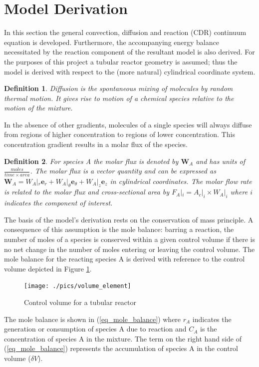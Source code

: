 \documentclass[11pt,fleqn]{article}
\theoremstyle{defstyle}
\newtheorem{defn}{Definition}[section]
\begin{document}
\section{Model Derivation}
In this section the general convection, diffusion and reaction (CDR) continuum equation is developed. Furthermore, the accompanying energy balance necessitated by the reaction component of the resultant model is also derived. For the purposes of this project a tubular reactor geometry is assumed; thus the model is derived with respect to the (more natural) cylindrical coordinate system. 
\begin{defn}
Diffusion is the spontaneous mixing of molecules by random thermal motion. It gives rise to motion of a chemical species relative to the motion of the mixture.
\end{defn}
In the absence of other gradients, molecules of a single species will always diffuse from regions of higher concentration to regions of lower concentration. This concentration gradient results in a molar flux of the species.
\begin{defn}
For species A the molar flux is denoted by $\mathbf{W}_A$ and has units of $\frac{moles}{time \times area}$. The molar flux is a vector quantity and can be expressed as $\mathbf{W}_A = W_A|_r \mathbf{e}_r + W_A|_\theta \mathbf{e}_\theta + W_A|_z \mathbf{e}_z$ in cylindrical coordinates. The molar flow rate is related to the molar flux and cross-sectional area by $F_A|_i = A_c|_i \times W_A|_i$ where $i$ indicates the component of interest. 
\end{defn}
The basis of the model's derivation rests on the conservation of mass principle. A consequence of this assumption is the mole balance: barring a reaction, the number of moles of a species is conserved within a given control volume if there is no net change in the number of moles entering or leaving the control volume. The mole balance for the reacting species A is derived with reference to the control volume depicted in Figure \ref{fig_vol_element}.
\begin{figure}[H] 
\centering
\texttt{[image: ./pics/volume\_element]}
\caption{Control volume for a tubular reactor} 
\label{fig_vol_element}
\end{figure}
The mole balance is shown in (\ref{eq_mole_balance}) where $r_A$ indicates the generation or consumption of species A due to reaction and $C_A$ is the concentration of species A in the mixture. The term on the right hand side of (\ref{eq_mole_balance}) represents the accumulation of species A in the control volume ($\delta V$).
\end{document}
